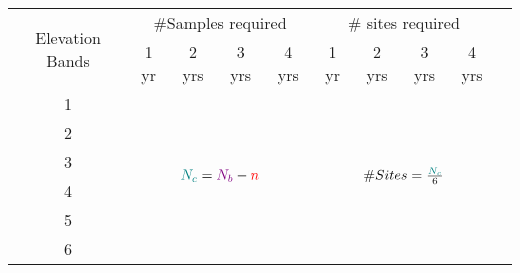 \begin{table}\scriptsize
\centering
\begin{tabular}{ccccc|ccccc}
\toprule
 \multirow{2}{1cm}{Elevation Bands}  &   \multicolumn{4}{c|}{ \#Samples required} & \multicolumn{4}{c}{\# sites required} \\ \cline{2-9}\noalign{\smallskip}
\multicolumn{1}{c}{}& 1 yr  & 2 yrs   & 3 yrs    & 4 yrs                   & 1 yr   & 2 yrs  & 3 yrs  & 4 yrs\\ \midrule
						
1  &\multicolumn{4}{c|}{\multirow{6}{*}{\large$\textcolor{teal}{N_c}={\textcolor{violet}{N_b} - \textcolor{red}{n}}$}}& \multicolumn{4}{c}{\multirow{6}{*}{\large$\#Sites = {\textcolor{teal}{N_c}\over 6}$}}                                                               \\ 
2    &\multicolumn{4}{c|}{}&\multicolumn{4}{c}{}                                                              \\ 
3   &\multicolumn{4}{c|}{}   &\multicolumn{4}{c}{}                                                                 \\
4    &\multicolumn{4}{c|}{}   &\multicolumn{4}{c}{}                                                             \\ 
5    &\multicolumn{4}{c|}{}    &\multicolumn{4}{c}{}                                                                \\ 
6    &\multicolumn{4}{c|}{}   &\multicolumn{4}{c}{}                                                       \\ \bottomrule
\end{tabular}
\end{table}